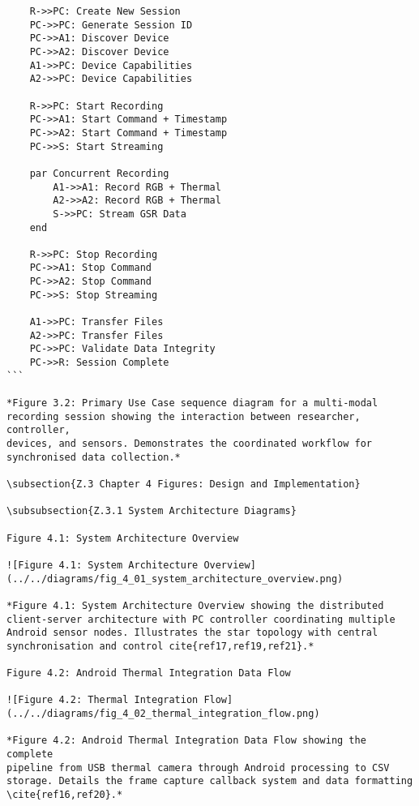\begin{verbatim}
    R->>PC: Create New Session
    PC->>PC: Generate Session ID
    PC->>A1: Discover Device
    PC->>A2: Discover Device
    A1->>PC: Device Capabilities
    A2->>PC: Device Capabilities

    R->>PC: Start Recording
    PC->>A1: Start Command + Timestamp
    PC->>A2: Start Command + Timestamp
    PC->>S: Start Streaming

    par Concurrent Recording
        A1->>A1: Record RGB + Thermal
        A2->>A2: Record RGB + Thermal
        S->>PC: Stream GSR Data
    end

    R->>PC: Stop Recording
    PC->>A1: Stop Command
    PC->>A2: Stop Command
    PC->>S: Stop Streaming

    A1->>PC: Transfer Files
    A2->>PC: Transfer Files
    PC->>PC: Validate Data Integrity
    PC->>R: Session Complete
```

*Figure 3.2: Primary Use Case sequence diagram for a multi-modal
recording session showing the interaction between researcher, controller,
devices, and sensors. Demonstrates the coordinated workflow for
synchronised data collection.*

\subsection{Z.3 Chapter 4 Figures: Design and Implementation}

\subsubsection{Z.3.1 System Architecture Diagrams}

Figure 4.1: System Architecture Overview

![Figure 4.1: System Architecture Overview](../../diagrams/fig_4_01_system_architecture_overview.png)

*Figure 4.1: System Architecture Overview showing the distributed
client-server architecture with PC controller coordinating multiple
Android sensor nodes. Illustrates the star topology with central
synchronisation and control cite{ref17,ref19,ref21}.*

Figure 4.2: Android Thermal Integration Data Flow

![Figure 4.2: Thermal Integration Flow](../../diagrams/fig_4_02_thermal_integration_flow.png)

*Figure 4.2: Android Thermal Integration Data Flow showing the complete
pipeline from USB thermal camera through Android processing to CSV
storage. Details the frame capture callback system and data formatting
\cite{ref16,ref20}.*


\end{verbatim}
